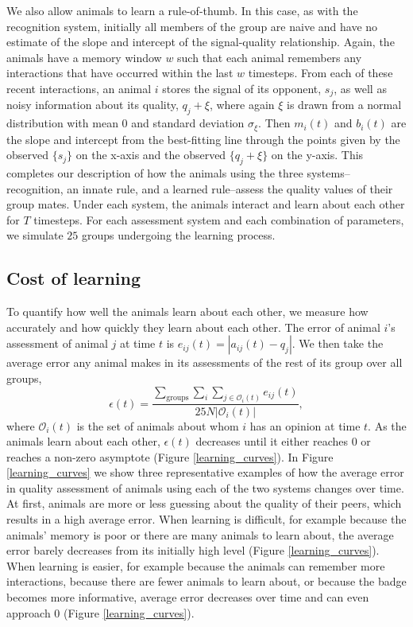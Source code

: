 We also allow animals to learn a rule-of-thumb. In this case, as with the recognition system, initially all members of the group are naive and have no estimate of the slope and intercept of the signal-quality relationship. Again, the animals have a memory window $w$ such that each animal remembers any interactions that have occurred within the last $w$ timesteps. From each of these recent interactions, an animal $i$ stores the signal of its opponent, $s_j$, as well as noisy information about its quality, $q_j+\xi$, where again $\xi$ is drawn from a normal distribution with mean $0$ and standard deviation $\sigma_\xi$.  Then $m_i(t)$ and $b_i(t)$ are the slope and intercept from the best-fitting line through the points given by the observed $\{s_j\}$ on the x-axis and the observed $\{q_j+\xi\}$ on the y-axis. This completes our description of how the animals using the three systems--recognition, an innate rule, and a learned rule--assess the quality values of their group mates. Under each system, the animals interact and learn about each other for $T$ timesteps. For each assessment system and each combination of parameters, we simulate $25$ groups undergoing the learning process. 
 
\subsection{Cost of learning }
To quantify how well the animals learn about each other, we measure how accurately and how quickly they learn about each other. The error of animal $i$'s assessment of animal $j$ at time $t$ is $e_{ij}(t)=|a_{ij}(t)-q_j|$. We then take the average error any animal makes in its assessments of the rest of its group over all groups, 
\begin{equation*}
\epsilon(t) = \frac{\sum_{\text{groups}}\sum_i\sum_{j\in \mathscr{O}_i(t)}e_{ij}(t)}{25N|\mathscr{O}_i(t)|},
\end{equation*}
where $\mathscr{O}_i(t)$ is the set of animals about whom $i$ has an opinion at time $t$.
As the animals learn about each other, $\epsilon(t)$ decreases until it either reaches $0$ or reaches a non-zero asymptote (Figure \ref{learning_curves}). In Figure \ref{learning_curves} we show three representative examples of how the average error in quality assessment of animals using each of the two systems changes over time. At first, animals are more or less guessing about the quality of their peers, which results in a high average error. When learning is difficult, for example because the animals' memory is poor or there are many animals to learn about, the average error barely decreases from its initially high level (Figure \ref{learning_curves}). When learning is easier, for example because the animals can remember more interactions, because there are fewer animals to learn about, or because the badge becomes more informative, average error decreases over time and can even approach $0$ (Figure \ref{learning_curves}).  


